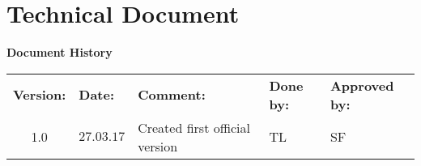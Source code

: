 \cleartoleftpage
{
\Hide
\part{Technical Document}
}

\begin{center}
\textbf{\large Document History}\\
\vspace*{0.2cm}
\begin{tabular}{cllll}
\rowcolor{cadetgrey}
\textbf{Version:}    &\textbf{Date:} 	 &\textbf{Comment:}    &\textbf{Done by:}   &\textbf{Approved by:}  \\
1.0   & $27.03.17$   & Created first official version  & TL  & SF \\
\end{tabular}                                                   
\end{center}

\vspace*{0.5cm}

